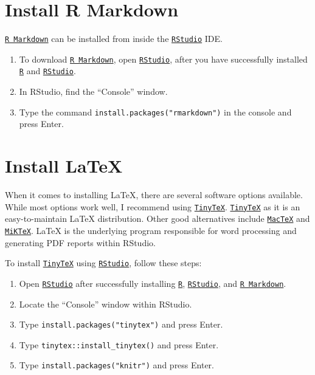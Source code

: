 \documentclass[
]{book}
\providecommand{\tightlist}{%
  \setlength{\itemsep}{0pt}\setlength{\parskip}{0pt}}
\begin{document}
\hypertarget{install-r-markdown}{%
\section{Install R Markdown}\label{install-r-markdown}}

\href{https://rmarkdown.rstudio.com/}{\texttt{R\ Markdown}} can be installed from inside the \href{https://rstudio.com/}{\texttt{RStudio}} IDE.

\begin{enumerate}
\def\labelenumi{\arabic{enumi}.}
\tightlist
\item
  To download \href{https://rmarkdown.rstudio.com/}{\texttt{R\ Markdown}}, open \href{https://rstudio.com/}{\texttt{RStudio}}, after you have successfully installed \href{https://www.r-project.org/}{\texttt{R}} and \href{https://rstudio.com/}{\texttt{RStudio}}.
\item
  In RStudio, find the ``Console'' window.
\item
  Type the command \texttt{install.packages("rmarkdown")} in the console and press Enter.
\end{enumerate}

\hypertarget{install-latex}{%
\section{Install LaTeX}\label{install-latex}}

When it comes to installing LaTeX, there are several software options available. While most options work well, I recommend using \href{https://yihui.org/tinytex/}{\texttt{TinyTeX}}. \href{https://yihui.org/tinytex/}{\texttt{TinyTeX}} as it is an easy-to-maintain LaTeX distribution. Other good alternatives include \href{https://www.tug.org/mactex/}{\texttt{MacTeX}} and \href{https://miktex.org/}{\texttt{MiKTeX}}. LaTeX is the underlying program responsible for word processing and generating PDF reports within RStudio.

To install \href{https://yihui.org/tinytex/}{\texttt{TinyTeX}} using \href{https://rstudio.com/}{\texttt{RStudio}}, follow these steps:

\begin{enumerate}
\def\labelenumi{\arabic{enumi}.}
\tightlist
\item
  Open \href{https://rstudio.com/}{\texttt{RStudio}} after successfully installing \href{https://www.r-project.org/}{\texttt{R}}, \href{https://rstudio.com/}{\texttt{RStudio}}, and \href{https://rmarkdown.rstudio.com/}{\texttt{R\ Markdown}}.
\item
  Locate the ``Console'' window within RStudio.
\item
  Type \texttt{install.packages("tinytex")} and press Enter.
\item
  Type \texttt{tinytex::install\_tinytex()} and press Enter.
\item
  Type \texttt{install.packages("knitr")} and press Enter.
\end{enumerate}
\end{document}

